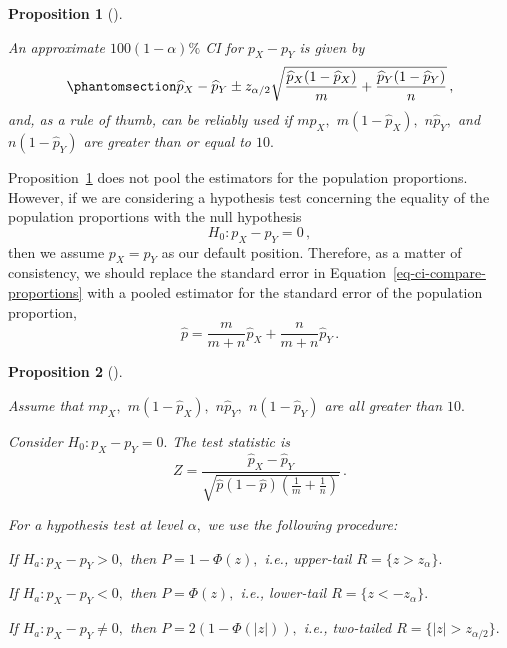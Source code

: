 \documentclass[
  a4paper,
  DIV=11,
  numbers=noendperiod,
  oneside]{scrreprt}
\theoremstyle{definition}
\theoremstyle{definition}
\theoremstyle{plain}
\newtheorem{proposition}{Proposition}[chapter]
\theoremstyle{plain}
\theoremstyle{definition}
\theoremstyle{remark}
\begin{document}
\begin{proposition}[]\protect\hypertarget{prp-ci-compare-proportions}{}\label{prp-ci-compare-proportions}

An approximate \(100(1-\alpha)\%\) CI for \(p_X - p_Y\) is given by
\begin{equation}\phantomsection\label{eq-ci-compare-proportions}{
 \widehat{p}_X - \widehat{p}_Y \pm z_{\alpha/2}\sqrt{\frac{\widehat{p}_X (1 - \widehat{p}_X)}{m} + \frac{\widehat{p}_Y (1 - \widehat{p}_Y)}{n}}\,,
}\end{equation} and, as a rule of thumb, can be reliably used if
\(m \widehat{p}_X,\) \(m (1 - \widehat{p}_X),\) \(n \widehat{p}_Y,\) and
\(n (1-\widehat{p}_Y)\) are greater than or equal to \(10.\)

\end{proposition}

Proposition~\ref{prp-ci-compare-proportions} does not pool the
estimators for the population proportions. However, if we are
considering a hypothesis test concerning the equality of the population
proportions with the null hypothesis \[
H_0 : p_X - p_Y = 0 \,,
\] then we assume \(p_X = p_Y\) as our default position. Therefore, as a
matter of consistency, we should replace the standard error in
Equation~\ref{eq-ci-compare-proportions} with a pooled estimator for the
standard error of the population proportion, \[
 \widehat{p} = \frac{m}{m + n} \widehat{p}_X + \frac{n}{m + n} \widehat{p}_Y \,.
\]

\begin{proposition}[]\protect\hypertarget{prp-htest-compare-proportions}{}\label{prp-htest-compare-proportions}

Assume that \(m \widehat{p}_X,\) \(m (1-\widehat{p}_X),\)
\(n\widehat{p}_Y,\) \(n(1-\widehat{p}_Y)\) are all greater than \(10.\)

Consider \(H_0 : p_X - p_Y = 0.\) The test statistic is \[
 Z = \frac{\widehat{p}_X - \widehat{p}_Y}{\sqrt{\widehat{p} (1 - \widehat{p}) \left( \frac{1}{m} + \frac{1}{n} \right)}} \,.
\]

For a hypothesis test at level \(\alpha,\) we use the following
procedure:

If \(H_a : p_X - p_Y > 0,\) then \(P = 1 - \Phi(z),\) i.e., upper-tail
\(R = \{z > z_{\alpha}\}.\)

If \(H_a : p_X - p_Y < 0,\) then \(P = \Phi(z),\) i.e., lower-tail
\(R = \{z < - z_{\alpha}\}.\)

If \(H_a : p_X - p_Y \neq 0,\) then \(P = 2(1-\Phi(|z|)),\) i.e.,
two-tailed \(R = \{|z| > z_{\alpha/2}\}.\)

\end{proposition}
\end{document}
